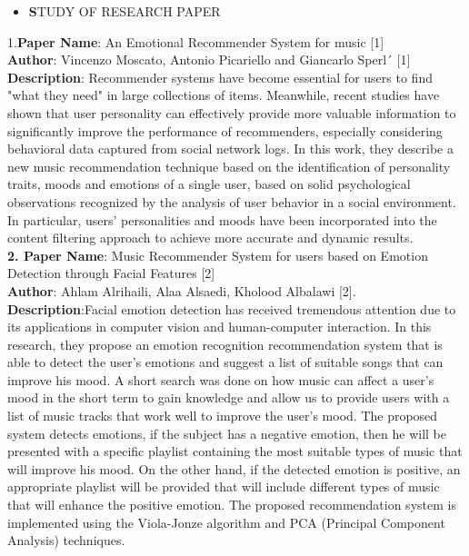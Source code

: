 \documentclass[12pt]{report}
\begin{document}
\justifying
\setlength{\parindent}{4em}
\setlength{\parskip}{0.5em}
\renewcommand{\baselinestretch}{1.5}
\normalsize
\begin{itemize}
\item \textbf STUDY OF RESEARCH PAPER
\end{itemize}
1.\textbf{Paper Name}:  An Emotional Recommender System for music [1]\\
\textbf{Author}:  Vincenzo Moscato, Antonio Picariello and Giancarlo Sperl´ [1]\\
\textbf{Description}: Recommender systems have become essential for users to find "what they need" 
in large collections of items. Meanwhile, recent studies have shown that user personality can 
effectively provide more valuable information to significantly improve the performance of 
recommenders, especially considering behavioral data captured from social network logs. In 
this work, they describe a new music recommendation technique based on the identification of 
personality traits, moods and emotions of a single user, based on solid psychological 
observations recognized by the analysis of user behavior in a social environment. In particular, 
users' personalities and moods have been incorporated into the content filtering approach to 
achieve more accurate and dynamic results.\\ 

\setlength{\parindent}{0em}
\textbf{2. Paper Name}:  Music Recommender System for users based on Emotion Detection through 
Facial Features [2]\\
\textbf{Author}:  Ahlam Alrihaili, Alaa Alsaedi, Kholood Albalawi [2].\\
\textbf{Description}:Facial emotion detection has received tremendous attention due to its 
applications in computer vision and human-computer interaction. In this research, they 
propose an emotion recognition recommendation system that is able to detect the user's 
emotions and suggest a list of suitable songs that can improve his mood. A short search was 
done on how music can affect a user's mood in the short term to gain knowledge and allow us 
to provide users with a list of music tracks that work well to improve the user's mood. The 
proposed system detects emotions, if the subject has a negative emotion, then he will be 
presented with a specific playlist containing the most suitable types of music that will improve 
his mood. On the other hand, if the detected emotion is positive, an appropriate playlist will 
be provided that will include different types of music that will enhance the positive emotion. 
The proposed recommendation system is implemented using the Viola-Jonze algorithm and 
PCA (Principal Component Analysis) techniques.\\
\end{document}
